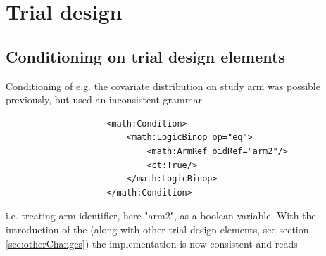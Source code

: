 \section{Trial design}

\subsection{Conditioning on trial design elements}
\label{subsec:condTrialDesingElems}

Conditioning of e.g. the covariate distribution on study arm was possible previously, 
but used an inconsistent grammar 
\lstset{language=XML}
\begin{lstlisting}
                    <math:Condition>
                        <math:LogicBinop op="eq">
                            <math:ArmRef oidRef="arm2"/>
                            <ct:True/>
                        </math:LogicBinop>
                    </math:Condition>
\end{lstlisting}
i.e. treating arm identifier, here "arm2", as a boolean variable.
With the introduction of the  (along with other trial design elements,
see section \ref{sec:otherChanges}) the implementation is now consistent and reads

